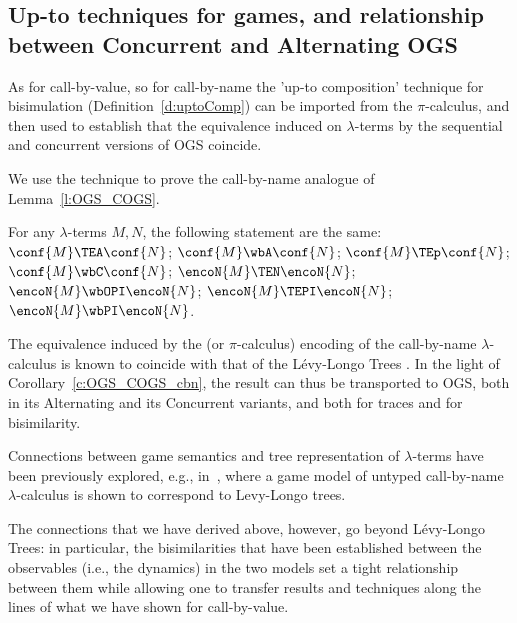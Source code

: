 \subsection{Up-to techniques for games, and relationship between Concurrent and Alternating OGS}
\label{ss:upto_games_cbn}

As for call-by-value, so for call-by-name the 
'up-to
  composition' technique for bisimulation 
(Definition~\ref{d:uptoComp}) 
can be imported from the $\pi$-calculus, and then used to establish that the equivalence
induced on $\lambda$-terms by the sequential and concurrent versions of OGS  coincide. 

We use  the technique to prove the call-by-name analogue of 
Lemma~\ref{l:OGS_COGS}. 



\begin{corollary}
\label{c:OGS_COGS_cbn}
For any   $\lambda$-terms $M,N$, the following statement are the same: 
$\conf{M} \TEA \conf {N}$;
$\conf{M} \wbA \conf {N}$;
$\conf{M} \TEp \conf {N}$;
$\conf{M} \wbC \conf {N}$;
$\encoN {{M} } \TEN\encoN {{N}}$; 
$\encoN {{M}} \wbOPI \encoN {{N}}$; 
$\encoN {{M} } \TEPI\encoN {{N}}$; 
$\encoN {{M}} \wbPI \encoN {{N}}$. 
\end{corollary} 
\noindent
The equivalence induced by the \piI (or  $\pi$-calculus) encoding of the call-by-name
$\lambda$-calculus is known to coincide with    that of the  
 L{\'e}vy-Longo Trees \cite{San95lazy}.  In the light of  
Corollary~\ref{c:OGS_COGS_cbn}, the result can thus be transported to OGS, both 
in its Alternating and its Concurrent variants, 
and both for traces and for bisimilarity.

Connections between game semantics and tree representation of $\lambda$-terms
have been previously explored, e.g.,  in~\cite{ong2004games}, 
where a game model of untyped call-by-name $\lambda$-calculus
is shown to correspond to Levy-Longo trees.

The connections that we have derived above, however, go beyond
L{\'e}vy-Longo Trees:
in particular,
the bisimilarities that have been established
between the observables (i.e., the dynamics) in the two models
set a tight relationship between them 
while allowing one to transfer results and techniques along the lines of what we have
shown for call-by-value.  
